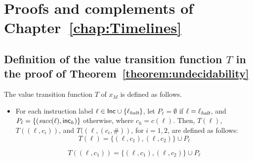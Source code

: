 \chapter{Proofs and complements of Chapter~\ref{chap:Timelines}}
\minitoc\mtcskip


\section{Definition of the value transition function $T$ in the proof of Theorem~\ref{theorem:undecidability}}\label{sec:undecidabilityTrans}

The value transition function $T$ of $x_M$ is defined as follows.
 \begin{itemize}
   \item For each instruction label $\ell\in \mathsf{Inc} \cup \{\ell_{\textit{halt}}\}$, let $P_\ell=\emptyset$ if $\ell=\ell_{\textit{halt}}$,
   and $P_\ell=\{({\textit{succ}}(\ell),{\mathsf{inc}}_h)\}$ otherwise, where $c_h= c(\ell)$. Then, $T(\ell)$, $T((\ell,c_i))$, and $T((\ell,(c_i,\#))$, for $i=1,2$, are defined as follows:
\[
T(\ell)   =  \{(\ell,c_1),(\ell,c_2)\}\cup P_\ell 
\]

\[
T((\ell,c_1))   =  \{(\ell,c_1),(\ell,c_2)\}\cup P_\ell
\]


\end{itemize}
